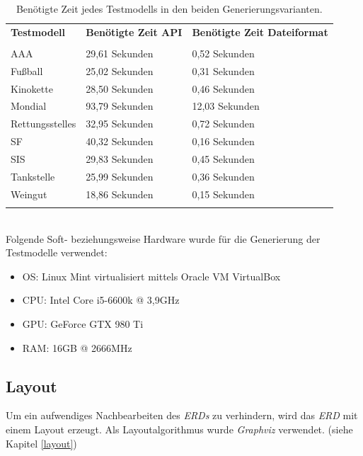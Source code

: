\begin{table}[H]
	\centering
	\begin{tabular}{lll}
		\textbf{Testmodell} & \textbf{Benötigte Zeit API}  & \textbf{Benötigte Zeit Dateiformat} \\
		\\
		AAA & 29,61 Sekunden           & 0,52 Sekunden             \\
		Fußball & 25,02 Sekunden      & 0,31 Sekunden            \\
		Kinokette & 28,50 Sekunden       & 0,46 Sekunden           \\
		Mondial & 93,79 Sekunden       & 12,03 Sekunden             \\
		Rettungsstelles & 32,95 Sekunden           & 0,72 Sekunden             \\
		SF & 40,32 Sekunden      & 0,16 Sekunden            \\
		SIS & 29,83 Sekunden       & 0,45 Sekunden             \\
		Tankstelle & 25,99 Sekunden       & 0,36 Sekunden             \\
		Weingut & 18,86 Sekunden       & 0,15 Sekunden             \\
		\\
	\end{tabular}
	
	\caption{Benötigte Zeit jedes Testmodells in den beiden Generierungsvarianten.}
	\label{tbl:performance}
\end{table}
\noindent
\hon{}
\\

\noindent
Folgende Soft- beziehungsweise Hardware wurde für die Generierung der Testmodelle verwendet:

\begin{itemize}
	\item OS: Linux Mint virtualisiert mittels Oracle VM VirtualBox
	\item CPU: Intel Core i5-6600k @ 3,9GHz
	\item GPU: GeForce GTX 980 Ti
	\item RAM: 16GB @ 2666MHz
\end{itemize}


\subsection{Layout}
\hon{}
\noindent
Um ein aufwendiges Nachbearbeiten des \textit{ERDs} zu verhindern, wird das \textit{ERD} mit einem Layout erzeugt. Als Layoutalgorithmus wurde \textit{Graphviz} verwendet. (siehe Kapitel \ref{layout})







